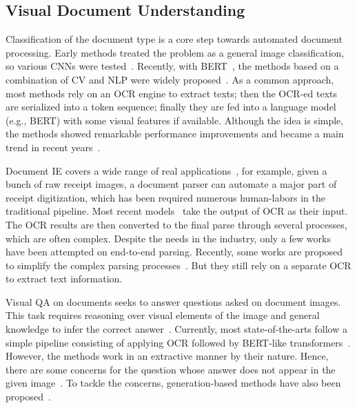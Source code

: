 \documentclass[runningheads]{llncs}
\begin{document}
\subsection{Visual Document Understanding}
Classification of the document type is a core step towards automated document processing.
Early methods treated the problem as a general image classification, so various CNNs were tested~\cite{Kang2014ConvolutionalNN,7333933,7333910}. Recently, with  BERT~\cite{devlinBERT2018}, the methods based on a combination of CV and NLP were widely proposed~\cite{xu2019_layoutLM,li-etal-2021-structurallm}.
As a common approach, most methods rely on an OCR engine to extract texts; then the OCR-ed texts are serialized into a token sequence; finally they are fed into a language model (e.g., BERT) with some visual features if available.
Although the idea is simple, the methods showed remarkable performance improvements and became a main trend in recent years~\cite{xu-etal-2021-layoutlmv2,selfdoc,Appalaraju_2021_ICCV}. 

Document IE covers a wide range of real applications~\cite{hwang2019pot,majumder2020representation}, for example, given a bunch of raw receipt images, a document parser can automate a major part of receipt digitization, which has been required numerous human-labors in the traditional pipeline.
Most recent models~\cite{hwang-etal-2021-spatial,hwang2021costeffective} take the output of OCR as their input.
The OCR results are then converted to the final parse through several processes, which are often complex.
Despite the needs in the industry, only a few works have been attempted on end-to-end parsing. Recently, some works are proposed to simplify the complex parsing processes~\cite{hwang-etal-2021-spatial,hwang2021costeffective}.
But they still rely on a separate OCR to extract text information.

Visual QA on documents seeks to answer questions asked on document images. This task requires reasoning over visual elements of the image and general knowledge to infer the correct answer~\cite{mathew2021docvqa}. Currently, most state-of-the-arts follow a simple pipeline consisting of applying OCR followed by BERT-like transformers~\cite{xu2019_layoutLM,xu-etal-2021-layoutlmv2}. However, the methods work in an extractive manner by their nature. Hence, there are some concerns for the question whose answer does not appear in the given image~\cite{icdar21docvqa}. To tackle the concerns, generation-based methods have also been proposed~\cite{10.1007/978-3-030-86331-9_47}. 
\end{document}
